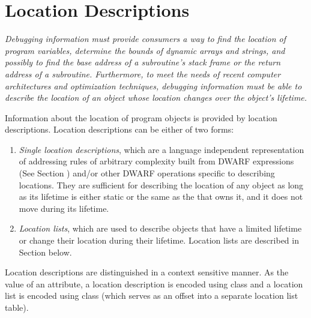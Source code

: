 \section{Location Descriptions}
\label{chap:locationdescriptions}
\textit{Debugging information 
must 
provide consumers a way to find
the location of program variables, determine the bounds
of dynamic arrays and strings, and possibly to find the
base address of a subroutine\textquoteright s stack frame or the return
address of a subroutine. Furthermore, to meet the needs of
recent computer architectures and optimization techniques,
debugging information must be able to describe the location of
an object whose location changes over the object\textquoteright s lifetime.}

Information about the location of program objects is provided
by location descriptions. Location descriptions can be either
of two forms:
\begin{enumerate}[1. ]
\item \textit{Single location descriptions}, 
which 
are 
a language independent representation of
addressing rules of arbitrary complexity built from 
DWARF expressions (See Section ) 
and/or other
DWARF operations specific to describing locations. They are
sufficient for describing the location of any object as long
as its lifetime is either static or the same as the 
 that owns it, 
and it does not move during its lifetime.

\bbpareb

\item \textit{Location lists}, which are used to 
describe
objects that have a limited lifetime or change their location
during their lifetime. Location lists are described in
Section  below.

\end{enumerate}

Location descriptions are distinguished in a context sensitive
manner. As the value of an attribute, a location description
is encoded using 
class   
and a location list is encoded
using class 
(which 
serves as an offset into a
separate 
location list table).

